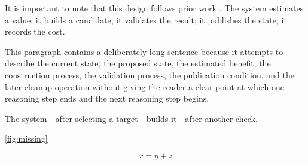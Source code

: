 It is important to note that this design follows prior work \cite{example}.
The system estimates a value; it builds a candidate; it validates the result;
it publishes the state; it records the cost.

This paragraph contains a deliberately long sentence because it attempts to
describe the current state, the proposed state, the estimated benefit, the
construction process, the validation process, the publication condition, and
the later cleanup operation without giving the reader a clear point at which
one reasoning step ends and the next reasoning step begins.

The system—after selecting a target—builds it—after another check.

\ref{fig:missing}

\begin{equation}
x = y + z
\label{eq:unused}
\end{equation}
